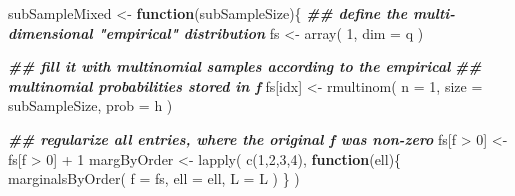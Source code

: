 \documentclass[
]{article}
\newenvironment{Shaded}{\begin{snugshade}}{\end{snugshade}}
\newcommand{\AttributeTok}[1]{\textcolor[rgb]{0.77,0.63,0.00}{#1}}
\newcommand{\ControlFlowTok}[1]{\textcolor[rgb]{0.13,0.29,0.53}{\textbf{#1}}}
\newcommand{\DecValTok}[1]{\textcolor[rgb]{0.00,0.00,0.81}{#1}}
\newcommand{\DocumentationTok}[1]{\textcolor[rgb]{0.56,0.35,0.01}{\textbf{\textit{#1}}}}
\newcommand{\FunctionTok}[1]{\textcolor[rgb]{0.00,0.00,0.00}{#1}}
\newcommand{\NormalTok}[1]{#1}
\newcommand{\OtherTok}[1]{\textcolor[rgb]{0.56,0.35,0.01}{#1}}
\newcommand{\SpecialCharTok}[1]{\textcolor[rgb]{0.00,0.00,0.00}{#1}}
\begin{document}
\begin{Shaded}
\begin{Highlighting}[]
\NormalTok{subSampleMixed }\OtherTok{\textless{}{-}} \ControlFlowTok{function}\NormalTok{(subSampleSize)\{}
  \DocumentationTok{\#\# define the multi{-}dimensional "empirical" distribution}
\NormalTok{  fs }\OtherTok{\textless{}{-}} \FunctionTok{array}\NormalTok{(}
    \DecValTok{1}\NormalTok{,}
    \AttributeTok{dim =}\NormalTok{ q}
\NormalTok{  )}
  
  \DocumentationTok{\#\# fill it with multinomial samples according to the empirical}
  \DocumentationTok{\#\# multinomial probabilities stored in f}
\NormalTok{  fs[idx] }\OtherTok{\textless{}{-}} \FunctionTok{rmultinom}\NormalTok{(}
    \AttributeTok{n =} \DecValTok{1}\NormalTok{, }
    \AttributeTok{size =}\NormalTok{ subSampleSize, }
    \AttributeTok{prob =}\NormalTok{ h}
\NormalTok{  )}
  
  \DocumentationTok{\#\# regularize all entries, where the original f was non{-}zero}
\NormalTok{  fs[f }\SpecialCharTok{\textgreater{}} \DecValTok{0}\NormalTok{] }\OtherTok{\textless{}{-}}\NormalTok{ fs[f }\SpecialCharTok{\textgreater{}} \DecValTok{0}\NormalTok{] }\SpecialCharTok{+} \DecValTok{1}
\NormalTok{  margByOrder }\OtherTok{\textless{}{-}} \FunctionTok{lapply}\NormalTok{(}
    \FunctionTok{c}\NormalTok{(}\DecValTok{1}\NormalTok{,}\DecValTok{2}\NormalTok{,}\DecValTok{3}\NormalTok{,}\DecValTok{4}\NormalTok{),}
    \ControlFlowTok{function}\NormalTok{(ell)\{}
      \FunctionTok{marginalsByOrder}\NormalTok{(}
        \AttributeTok{f =}\NormalTok{ fs,}
        \AttributeTok{ell =}\NormalTok{ ell,}
        \AttributeTok{L =}\NormalTok{ L}
\NormalTok{      )}
\NormalTok{    \}}
\NormalTok{  )}
  

\end{Highlighting}
\end{Shaded}
\end{document}
